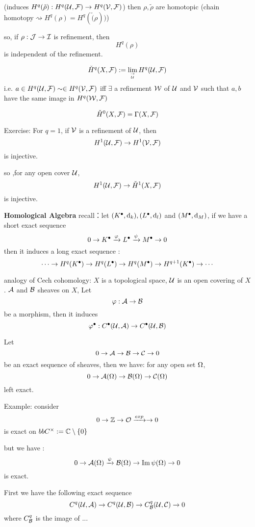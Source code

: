 (induces $H^q(\tilde{\rho}):H^q(\mathcal{U},\mathcal{F})\to H^q(\mathcal{V},\mathcal{F})$)
then $\rho,\tilde{\rho}$ are homotopic
(chain homotopy$\rightsquigarrow H^q(\rho)=H^q(\tilde(\rho))$)

so, if $\rho:\mathcal{J}\to \mathcal{I}$ is refinement, then
$$H^q(\rho)$$
is independent of the refinement.

\begin{definition}
$$\check{H}^q(X,\mathcal{F}):=\lim_{\to\atop\mathcal{U}} H^q(\mathcal{U},\mathcal{F})$$
i.e. $a\in H^q(\mathcal{U},\mathcal{F})\sim\in H^q(\mathcal{V},\mathcal{F})$ iff
$\exists$ a refinement $\mathcal{W}$ of $\mathcal{U}$ and $\mathcal{V}$ such that
$a,b$ have the same image in $H^q(\mathcal{W},\mathcal{F})$
\end{definition}

\begin{rem}
$$\check{H}^0(X,\mathcal{F})=\Gamma(X,\mathcal{F})$$

Exercise: For $q=1$, if $\mathcal{V}$ is a refinement of $\mathcal{U}$,
then
$$H^1(\mathcal{U},\mathcal{F})\to H^1(\mathcal{V},\mathcal{F})$$
is injective.
\end{rem}

so ,for any open cover $\mathcal{U}$,
$$H^1(\mathcal{U},\mathcal{F})\to \check{H}^1(X,\mathcal{F})$$
is injective.

\textbf{Homological Algebra}
recall：let $(K^{\bullet},\mathrm{d}_k),(L^{\bullet},\mathrm{d}_l)$ and $(M^{\bullet},\mathrm{d}_M)$,
if we have a short exact sequence
$$0\to K^{\bullet}\xrightarrow{\varphi} L^{\bullet}\xrightarrow{\psi}M^{\bullet}\to 0$$
then it induces a long exact sequence :
$$
  \cdots\to H^q(K^{\bullet})\to
  H^q(L^{\bullet})\to
  H^q(M^{\bullet})\to
  H^{q+1}(K^{\bullet})\to\cdots
$$

analogy of Cech cohomology: $X$ is a topological space,
$\mathcal{U}$ is an open covering of $X$.
$\mathcal{A}$ and $\mathcal{B}$ sheaves on $X$, Let
$$\varphi:\mathcal{A}\to\mathcal{B}$$
be a morphism, then it induces
$$\varphi^{\bullet}:C^{\bullet}(\mathcal{U},\mathcal{A})\to C^{\bullet}(\mathcal{U},\mathcal{B})$$

Let
$$0\to \mathcal{A}\to\mathcal{B}\to\mathcal{C}\to 0$$
be an exact sequence of sheaves, then we have:
for any open set $\Omega$,
$$0\to \mathcal{A}(\Omega)\to \mathcal{B}(\Omega)\to\mathcal{C}(\Omega)$$
left exact.

Example: consider
$$0\to\mathbb{Z}\to\mathcal{O}\xrightarrow{exp}\to0$$
is exact on $bbC^{\times}:=\mathbb{C}\setminus\{0\}$

but we have :
$$0\to\mathcal{A}(\Omega)\xrightarrow{\psi}\mathcal{B}(\Omega)\to\operatorname{Im}\psi(\Omega)\to 0$$
is exact.

First we have the following exact sequence
$$C^q(\mathcal{U},\mathcal{A})\to C^q(\mathcal{U},\mathcal{B})\to C^q_{\mathcal{B}}(\mathcal{U},\mathcal{C})\to 0$$
where $C_{\mathcal{B}}^q$ is the image of ...

